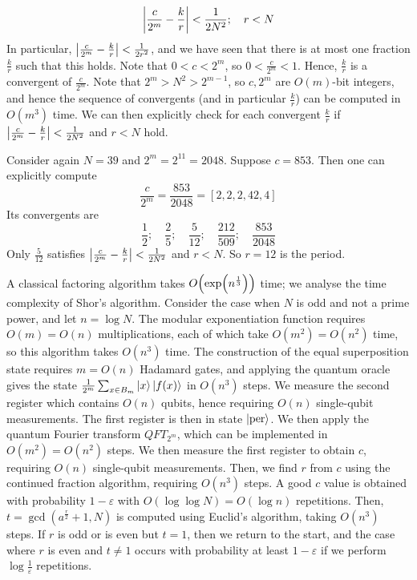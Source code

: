 \[ \abs{\frac{c}{2^m} - \frac{k}{r}} < \frac{1}{2N^2};\quad r < N \]
In particular, \( \abs{\frac{c}{2^m} - \frac{k}{r}} < \frac{1}{2r^2} \), and we have seen that there is at most one fraction \( \frac{k}{r} \) such that this holds.
Note that \( 0 < c < 2^m \), so \( 0 < \frac{c}{2^m} < 1 \).
Hence, \( \frac{k}{r} \) is a convergent of \( \frac{c}{2^m} \).
Note that \( 2^m > N^2 > 2^{m-1} \), so \( c, 2^m \) are \( O(m) \)-bit integers, and hence the sequence of convergents (and in particular \( \frac{k}{r} \)) can be computed in \( O(m^3) \) time.
We can then explicitly check for each convergent \( \frac{k}{r} \) if \( \abs{\frac{c}{2^m} - \frac{k}{r}} < \frac{1}{2N^2} \) and \( r < N \) hold.
\begin{example}
    Consider again \( N = 39 \) and \( 2^m = 2^{11} = 2048 \).
    Suppose \( c = 853 \).
    Then one can explicitly compute
    \[ \frac{c}{2^m} = \frac{853}{2048} = [2, 2, 2, 42, 4] \]
    Its convergents are
    \[ \frac{1}{2};\quad \frac{2}{5};\quad \frac{5}{12};\quad \frac{212}{509};\quad \frac{853}{2048} \]
    Only \( \frac{5}{12} \) satisfies \( \abs{\frac{c}{2^m} - \frac{k}{r}} < \frac{1}{2N^2} \) and \( r < N \).
    So \( r = 12 \) is the period.
\end{example}
A classical factoring algorithm takes \( O\qty(\exp(n^{\frac{1}{3}})) \) time; we analyse the time complexity of Shor's algorithm.
Consider the case when \( N \) is odd and not a prime power, and let \( n = \log N \).
The modular exponentiation function requires \( O(m) = O(n) \) multiplications, each of which take \( O(m^2) = O(n^2) \) time, so this algorithm takes \( O(n^3) \) time.
The construction of the equal superposition state requires \( m = O(n) \) Hadamard gates, and applying the quantum oracle gives the state \( \frac{1}{2^m} \sum_{x \in B_m} \ket{x} \ket{f(x)} \) in \( O(n^3) \) steps.
We measure the second register which contains \( O(n) \) qubits, hence requiring \( O(n) \) single-qubit measurements.
The first register is then in state \( \ket{\mathrm{per}} \).
We then apply the quantum Fourier transform \( QFT_{2^m} \), which can be implemented in \( O(m^2) = O(n^2) \) steps.
We then measure the first register to obtain \( c \), requiring \( O(n) \) single-qubit measurements.
Then, we find \( r \) from \( c \) using the continued fraction algorithm, requiring \( O(n^3) \) steps.
A good \( c \) value is obtained with probability \( 1 - \varepsilon \) with \( O(\log \log N) = O(\log n) \) repetitions.
Then, \( t = \gcd(a^{\frac{r}{2}} + 1, N) \) is computed using Euclid's algorithm, taking \( O(n^3) \) steps.
If \( r \) is odd or is even but \( t = 1 \), then we return to the start, and the case where \( r \) is even and \( t \neq 1 \) occurs with probability at least \( 1 - \varepsilon \) if we perform \( \log \frac{1}{\varepsilon} \) repetitions.
